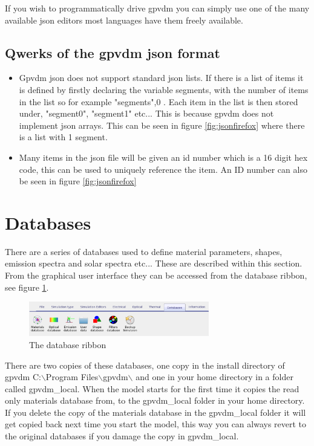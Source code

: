 If you wish to programmatically drive gpvdm you can simply use one of the many available json editors most languages have them freely available. 

\subsection{Qwerks of the gpvdm json format}
\begin{itemize}
  \item Gpvdm json does not support standard json lists.  If there is a list of items it is defined by firstly declaring the variable segments, with the number of items in the list so for example "segments",0 . Each item in the list is then stored under, "segment0", "segment1" etc... This is because gpvdm does not implement json arrays.  This can be seen in figure \ref{fig:jsonfirefox} where there is a list with 1 segment.
  \item Many items in the json file will be given an id number which is a 16 digit hex code, this can be used to uniquely reference the item. An ID number can also be seen in figure \ref{fig:jsonfirefox}
\end{itemize}



\section{Databases}



There are a series of databases used to define material parameters, shapes, emission spectra and solar spectra etc...  These are described within this section.  From the graphical user interface they can be accessed from the database ribbon, see figure \ref{fig:database}.

\begin{figure}[H]
\centering
\includegraphics[width=0.7\textwidth]{./images/database_ribbon.png}
\caption{The database ribbon}
\label{fig:database}
\end{figure}

There are two copies of these databases, one copy in the install directory of gpvdm  C:$\backslash$Program Files$\backslash$gpvdm$\backslash$ and one in your home directory in a folder called gpvdm\_local.   When the model starts for the first time it copies the read only materials database from, to the gpvdm\_local folder in your home directory.  If you delete the copy of the materials database in the gpvdm\_local folder it will get copied back next time you start the model, this way you can always revert to the original databases if you damage the copy in gpvdm\_local.

